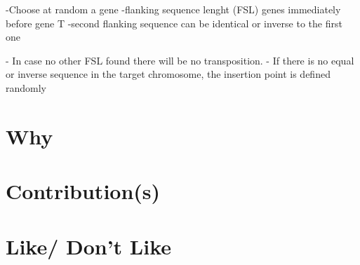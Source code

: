 \documentclass[12pt,portuguese,a4paper]{article}
\begin{document}
-Choose at random a gene
-flanking sequence lenght (FSL) genes immediately before gene T
-second flanking sequence can be identical or inverse to the first one

- In case no other FSL found there will be no transposition.
- If there is no equal or inverse sequence in the target chromosome, the insertion point is defined randomly


\section{Why}


\section{Contribution(s)}



\section{Like/ Don't Like}




\end{document}
